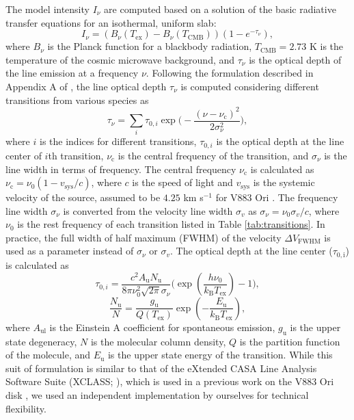 \documentclass[twocolumn, twocolappendix, astrosymb, times]{aastex631}
\begin{document}
The model intensity $I_\nu$ are computed based on a solution of the basic radiative transfer equations for an isothermal, uniform slab:
\begin{equation}
    I_\nu = (B_\nu(T_\mathrm{ex}) - B_\nu(T_\mathrm{CMB})) (1 - e^{-\tau_\nu}),
\end{equation}
where $B_\nu$ is the Planck function for a blackbody radiation, $T_\mathrm{CMB} = 2.73$ K is the temperature of the cosmic microwave background, and $\tau_\nu$ is the optical depth of the line emission at a frequency $\nu$. Following the formulation described in Appendix A of \citet{Yamato2022}, the line optical depth $\tau_\nu$ is computed considering different transitions from various species as
\begin{equation}
    \tau_\nu = \sum_{i}\tau_{0, i} \exp\bigg(-\frac{(\nu - \nu_\mathrm{c})^2}{2 \sigma_\nu^2}\bigg),
\end{equation}
where $i$ is the indices for different transitions, $\tau_{0, i}$ is the optical depth at the line center of $i$th transition, $\nu_\mathrm{c}$ is the central frequency of the transition, and $\sigma_\nu$ is the line width in terms of frequency. The central frequency $\nu_\mathrm{c}$ is calculated as $\nu_\mathrm{c} = \nu_0 (1 - v_\mathrm{sys}/c)$, where $c$ is the speed of light and $v_\mathrm{sys}$ is the systemic velocity of the source, assumed to be $4.25$ km s$^{-1}$ for V883 Ori \citep{Tobin2023}. The frequency line width $\sigma_\nu$ is converted from the velocity line width $\sigma_v$ as $\sigma_\nu = \nu_0 \sigma_v / c$, where $\nu_0$ is the rest frequency of each transition listed in Table \ref{tab:transitions}. In practice, the full width of half maximum (FWHM) of the velocity $\Delta V_\mathrm{FWHM}$ is used as a parameter instead of $\sigma_\nu$ or $\sigma_v$. The optical depth at the line center ($\tau_\mathrm{0, i}$) is calculated as
\begin{equation}
    \tau_{0, i} = \frac{c^2A_\mathrm{u}N_\mathrm{u}}{8\pi\nu_0^2\sqrt{2\pi}\sigma_\nu}\Bigg(\exp\left(\frac{h\nu_0}{k_\mathrm{B}T_\mathrm{ex}}\right) - 1\Bigg),
\end{equation}
\begin{equation}
    \frac{N_\mathrm{u}}{N} = \frac{g_\mathrm{u}}{Q(T_\mathrm{ex})}\exp\left(-\frac{E_\mathrm{u}}{k_\mathrm{B}T_\mathrm{ex}}\right),
\end{equation}
where $A_\mathrm{ul}$ is the Einstein A coefficient for spontaneous emission, $g_\mathrm{u}$ is the upper state degeneracy, $N$ is the molecular column density, $Q$ is the partition function of the molecule, and $E_\mathrm{u}$ is the upper state energy of the transition. While this suit of formulation is similar to that of the eXtended CASA Line Analysis Software Suite (XCLASS; \citealt{Moller2017}), which is used in a previous work on the V883 Ori disk \citep{Lee2019}, we used an independent implementation by ourselves for technical flexibility.
\end{document}
